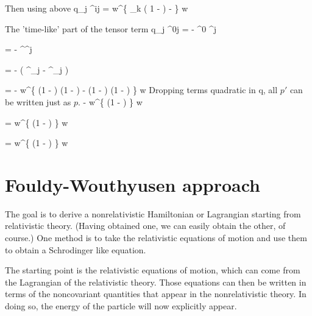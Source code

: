 Then using above
\beq
	\srb  {} q_j \sigma^{ij} \sr 
		=  w^\dagger \left \{
			\sigma_k \left( 1 -  \right ) -  
		\right \} w 
\eeq

The 'time-like' part of the tensor term
\beq
	\srb  {} q_j \sigma^{0j} \sr
		=	 -  \srb \gamma^0 \gamma^j \sr 		
 \eeq
 
 \beq
 	=  -  \sr^\dagger \gamma^j \sr
 \eeq
 
 \beq
 	= -   \left( \eta^\dagger \sigma_j \chi - \chi^\dagger \sigma_j \eta \right )
 \eeq
 
\beq
	= -   w^\dagger \left \{
		\left(1 -  \right )   \left(1 -  \right )
		- \left(1 -  \right )  \left(1 -  \right )
	\right \} w
\eeq
Dropping terms quadratic in q, all $p'$ can be written just as $p$.
\beq
	\approx -   w^\dagger \left \{
		 \left(1 -  \right )
	\right \} w
\eeq		

\beq
	=    w^\dagger \left \{
		 \left(1 -  \right )
	\right \} w
\eeq

\beq
	=  w^\dagger \left \{
		 \left(1 -  \right )
	\right \} w
\eeq

			


 \section{Fouldy-Wouthyusen approach}
 
The goal is to derive a nonrelativistic Hamiltonian or Lagrangian starting from relativistic theory.  (Having obtained one, we can easily obtain the other, of course.)  One method is to take the relativistic equations of motion and use them to obtain a Schrodinger like equation.

The starting point is the relativistic equations of motion, which can come from the Lagrangian of the relativistic theory.  Those equations can then be written in terms of the noncovariant quantities that appear in the nonrelativistic theory.  In doing so, the energy of the particle will now explicitly appear.

